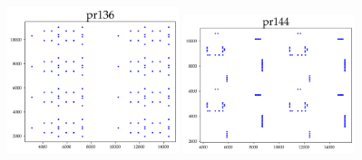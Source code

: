 \begin{appendices}
\begin{figure}[H]
\includegraphics[width=5cm]{../tsplib_euc2d_pictures_of_instances/pr136.png}
\includegraphics[width=5cm]{../tsplib_euc2d_pictures_of_instances/pr144.png}

\end{figure}


\end{appendices}
